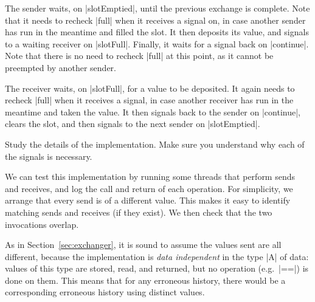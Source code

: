 The sender waits, on |slotEmptied|, until the previous exchange is complete.
Note that it needs to recheck |full| when it receives a signal on, in case
another sender has run in the meantime and filled the slot.  It then deposits
its value, and signals to a waiting receiver on |slotFull|.  Finally, it waits
for a signal back on |continue|.  Note that there is no need to recheck |full|
at this point, as it cannot be preempted by another sender. 

The receiver waits, on |slotFull|, for a value to be deposited.  It again
needs to recheck |full| when it receives a signal, in case another receiver
has run in the meantime and taken the value.  It then signals back to the
sender on |continue|, clears the slot, and then signals to the next sender on
|slotEmptied|. 

\begin{instruction}
Study the details of the implementation.  Make sure you understand why each of
the signals is necessary.
\end{instruction}


We can test this implementation by running some threads that perform sends and
receives, and log the call and return of each operation.  For simplicity, we
arrange that every send is of a different value.  This makes it easy to
identify matching sends and receives (if they exist).  We then check that the
two invocations overlap.  

As in Section~\ref{sec:exchanger}, it is sound to assume the values sent are
all different, because the implementation is \emph{data independent} in the
type |A| of data: values of this type are stored, read, and returned, but no
operation (e.g.~|==|) is done on them.  This means that for any erroneous
history, there would be a corresponding erroneous history using distinct
values.

